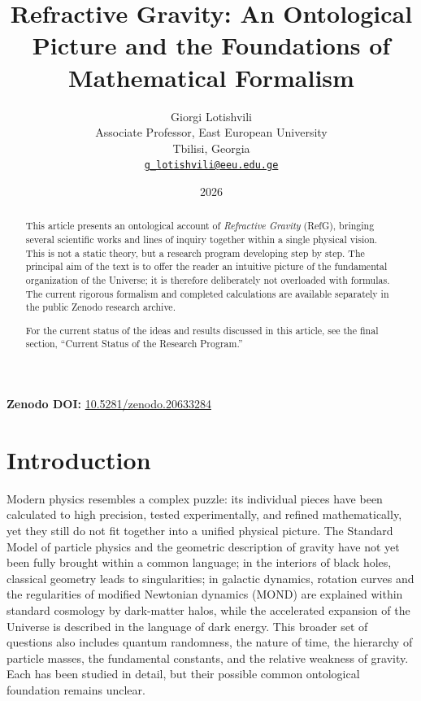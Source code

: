 \documentclass[11pt,a4paper]{article}
\title{\textbf{Refractive Gravity: An Ontological Picture and the Foundations of Mathematical Formalism}}
\author{Giorgi Lotishvili\\
\small Associate Professor, East European University\\
\small Tbilisi, Georgia\\
\small \href{mailto:g_lotishvili@eeu.edu.ge}{\texttt{g\_lotishvili@eeu.edu.ge}}}
\date{2026}
\begin{document}
\maketitle

\begin{center}
\textbf{Zenodo DOI:} \href{https://doi.org/10.5281/zenodo.20633284}{10.5281/zenodo.20633284}
\end{center}

\begin{abstract}
This article presents an ontological account of \emph{Refractive Gravity} (RefG), bringing several scientific works and lines of inquiry together within a single physical vision. This is not a static theory, but a research program developing step by step. The principal aim of the text is to offer the reader an intuitive picture of the fundamental organization of the Universe; it is therefore deliberately not overloaded with formulas. The current rigorous formalism and completed calculations are available separately in the public Zenodo research archive.

For the current status of the ideas and results discussed in this article, see the final section, ``Current Status of the Research Program.''
\end{abstract}

\tableofcontents
\clearpage

\section*{Introduction}

Modern physics resembles a complex puzzle: its individual pieces have been calculated to high precision, tested experimentally, and refined mathematically, yet they still do not fit together into a unified physical picture. The Standard Model of particle physics and the geometric description of gravity have not yet been fully brought within a common language; in the interiors of black holes, classical geometry leads to singularities; in galactic dynamics, rotation curves and the regularities of modified Newtonian dynamics (MOND) are explained within standard cosmology by dark-matter halos, while the accelerated expansion of the Universe is described in the language of dark energy. This broader set of questions also includes quantum randomness, the nature of time, the hierarchy of particle masses, the fundamental constants, and the relative weakness of gravity. Each has been studied in detail, but their possible common ontological foundation remains unclear.
\end{document}
